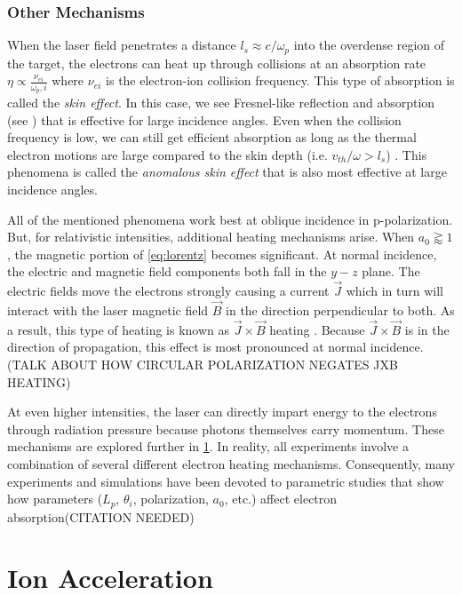 \subsubsection{Other Mechanisms}
When the laser field penetrates a distance $l_s \approx c / \omega_p$ into the overdense region of the target, the electrons can heat up through collisions at an absorption rate $\eta \propto \frac{\nu_{ei}}{\omega_p,i}$ \cite{Gibbon_2005_Plasma} where $\nu_{ei}$ is the electron-ion collision frequency. This type of absorption is called the \emph{skin effect}. In this case, we see Fresnel-like reflection and absorption (see \cite{Griffiths_2017}) that is effective for large incidence angles. Even when the collision frequency is low, we can still get efficient absorption as long as the thermal electron motions are large compared to the skin depth (i.e. $v_{th}/\omega > l_s$) \cite{Gibbon_2005_Plasma}. This phenomena is called the \emph{anomalous skin effect} that is also most effective at large incidence angles. 

All of the mentioned phenomena work best at oblique incidence in p-polarization. But, for relativistic intensities, additional heating mechanisms arise. When $a_0 \gtrapprox 1$, the magnetic portion of \cref{eq:lorentz} becomes significant. At normal incidence, the electric and magnetic field components both fall in the $y-z$ plane. The electric fields move the electrons strongly causing a current $\vec{J}$ which in turn will interact with the laser magnetic field $\vec{B}$ in the direction perpendicular to both. As a result, this type of heating is known as $\vec{J} \times \vec{B}$ heating \cite{Gibbon_2005_Plasma,Kruer_1985_PoF}. Because $\vec{J} \times \vec{B}$ is in the direction of propagation, this effect is most pronounced at normal incidence. (TALK ABOUT HOW CIRCULAR POLARIZATION NEGATES JXB HEATING)

At even higher intensities, the laser can directly impart energy to the electrons through radiation pressure \cite{Macchi_2013_RevModPhys} because photons themselves carry momentum. These mechanisms are explored further in \cref{sec:acceleration}. In reality, all experiments involve a combination of several different electron heating mechanisms. Consequently, many experiments and simulations have been devoted to parametric studies that show how parameters ($L_p$, $\theta_i$, polarization, $a_0$, etc.) affect electron absorption(CITATION NEEDED)

\section{Ion Acceleration} \label{sec:acceleration}

